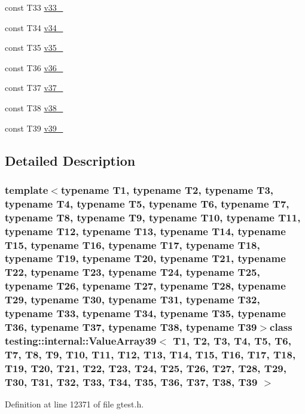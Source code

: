 \begin{DoxyCompactItemize}
\item 
const \-T33 \hyperlink{classtesting_1_1internal_1_1ValueArray39_a7a6cefe370b709c3a7b35b6d5ca8c778}{v33\-\_\-}
\item 
const \-T34 \hyperlink{classtesting_1_1internal_1_1ValueArray39_ab379e4d515d66bc57e05267515fab1d9}{v34\-\_\-}
\item 
const \-T35 \hyperlink{classtesting_1_1internal_1_1ValueArray39_a0a36112ac9b7a13572874977627ed192}{v35\-\_\-}
\item 
const \-T36 \hyperlink{classtesting_1_1internal_1_1ValueArray39_a531a52e3e8de6e982edd23c2547e4c49}{v36\-\_\-}
\item 
const \-T37 \hyperlink{classtesting_1_1internal_1_1ValueArray39_a2c4a91368c3edf933948acb4996a833d}{v37\-\_\-}
\item 
const \-T38 \hyperlink{classtesting_1_1internal_1_1ValueArray39_a364bf323d933a4adac3a9b46952ae1d3}{v38\-\_\-}
\item 
const \-T39 \hyperlink{classtesting_1_1internal_1_1ValueArray39_a0bd84ae118aa56fd251e494d1abc19fb}{v39\-\_\-}
\end{DoxyCompactItemize}


\subsection{\-Detailed \-Description}
\subsubsection*{template$<$typename T1, typename T2, typename T3, typename T4, typename T5, typename T6, typename T7, typename T8, typename T9, typename T10, typename T11, typename T12, typename T13, typename T14, typename T15, typename T16, typename T17, typename T18, typename T19, typename T20, typename T21, typename T22, typename T23, typename T24, typename T25, typename T26, typename T27, typename T28, typename T29, typename T30, typename T31, typename T32, typename T33, typename T34, typename T35, typename T36, typename T37, typename T38, typename T39$>$class testing\-::internal\-::\-Value\-Array39$<$ T1, T2, T3, T4, T5, T6, T7, T8, T9, T10, T11, T12, T13, T14, T15, T16, T17, T18, T19, T20, T21, T22, T23, T24, T25, T26, T27, T28, T29, T30, T31, T32, T33, T34, T35, T36, T37, T38, T39 $>$}



\-Definition at line 12371 of file gtest.\-h.



